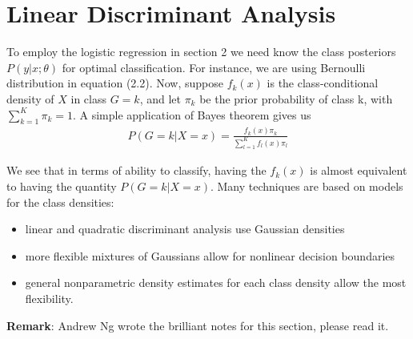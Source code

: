 \documentclass[12pt]{article}
\theoremstyle{definition}
\numberwithin{equation}{section}
\numberwithin{figure}{section}
\numberwithin{table}{section}
\begin{document}
\section{Linear Discriminant Analysis}

To employ the logistic regression in section 2 we need know the class posteriors $P(y| x; \theta)$ for optimal classification. For instance, we are using Bernoulli distribution in equation (2.2). Now, suppose $f_k(x)$ is the class-conditional density of $X$ in class $G = k$, and let $\pi_k$ be the prior probability of class k, with $\sum_{k = 1}^K \pi_k = 1$. A simple application of Bayes theorem gives us
\begin{align}
  P(G = k | X = x) = \frac{f_k(x) \pi_k}{\sum_{l = 1}^K f_l(x) \pi_l}
\end{align}

We see that in terms of ability to classify, having the $f_k(x)$ is almost equivalent to having the quantity $P(G = k |X = x)$. Many techniques are based on models for the class densities:
\begin{itemize}
  \item linear and quadratic discriminant analysis use Gaussian densities
  \item more flexible mixtures of Gaussians allow for nonlinear decision boundaries
  \item general nonparametric density estimates for each class density allow the most flexibility.
\end{itemize}

\noindent
\textbf{Remark}: Andrew Ng wrote the brilliant notes for this section, please read it. 





\newpage


\end{document}

